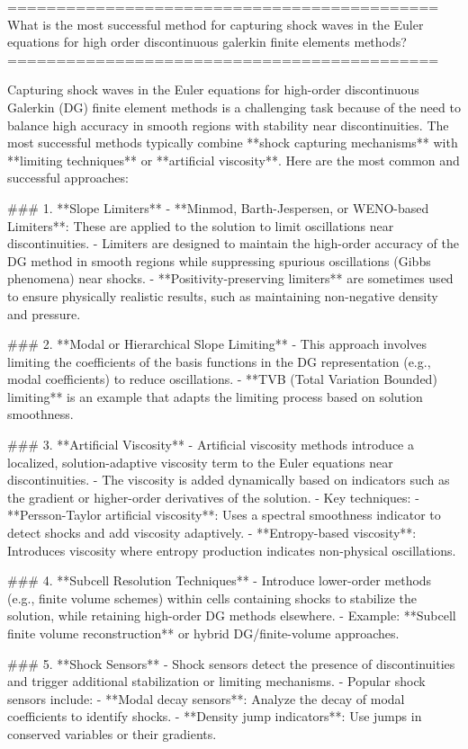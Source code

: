 ============================================
What is the most successful method for capturing shock waves in the Euler equations for high order discontinuous galerkin finite elements methods?
============================================

Capturing shock waves in the Euler equations for high-order discontinuous Galerkin (DG) finite element methods is a challenging task because of the need to balance high accuracy in smooth regions with stability near discontinuities. The most successful methods typically combine **shock capturing mechanisms** with **limiting techniques** or **artificial viscosity**. Here are the most common and successful approaches:

### 1. **Slope Limiters**
   - **Minmod, Barth-Jespersen, or WENO-based Limiters**: These are applied to the solution to limit oscillations near discontinuities.
   - Limiters are designed to maintain the high-order accuracy of the DG method in smooth regions while suppressing spurious oscillations (Gibbs phenomena) near shocks.
   - **Positivity-preserving limiters** are sometimes used to ensure physically realistic results, such as maintaining non-negative density and pressure.

### 2. **Modal or Hierarchical Slope Limiting**
   - This approach involves limiting the coefficients of the basis functions in the DG representation (e.g., modal coefficients) to reduce oscillations.
   - **TVB (Total Variation Bounded) limiting** is an example that adapts the limiting process based on solution smoothness.

### 3. **Artificial Viscosity**
   - Artificial viscosity methods introduce a localized, solution-adaptive viscosity term to the Euler equations near discontinuities.
   - The viscosity is added dynamically based on indicators such as the gradient or higher-order derivatives of the solution.
   - Key techniques:
     - **Persson-Taylor artificial viscosity**: Uses a spectral smoothness indicator to detect shocks and add viscosity adaptively.
     - **Entropy-based viscosity**: Introduces viscosity where entropy production indicates non-physical oscillations.

### 4. **Subcell Resolution Techniques**
   - Introduce lower-order methods (e.g., finite volume schemes) within cells containing shocks to stabilize the solution, while retaining high-order DG methods elsewhere.
   - Example: **Subcell finite volume reconstruction** or hybrid DG/finite-volume approaches.

### 5. **Shock Sensors**
   - Shock sensors detect the presence of discontinuities and trigger additional stabilization or limiting mechanisms.
   - Popular shock sensors include:
     - **Modal decay sensors**: Analyze the decay of modal coefficients to identify shocks.
     - **Density jump indicators**: Use jumps in conserved variables or their gradients.

